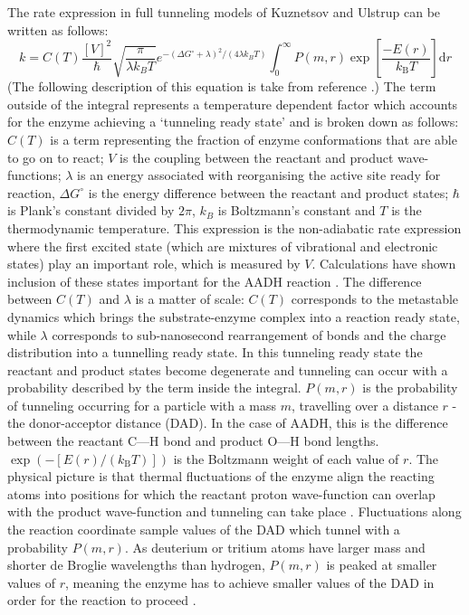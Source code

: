 The rate expression in full tunneling models of Kuznetsov and Ulstrup \cite{kuznetsovProtonHydrogenAtom1999a, knappTemperatureDependentIsotopeEffects2002, kohenRoleDynamicsEnzyme2015} can be written as follows: 
\begin{equation}\label{eqn:full_tunnel}
k = C(T)\frac{[V]^{2}}{\hbar} \sqrt{\frac{\pi}{\lambda k_{B}T}} e^{-(\Delta G^{\circ} + \lambda)^{2}/(4\lambda k_{B}T)} \int_{0}^{\infty} P(m,r) \exp \left[\frac{-E(r) }{k_{\mathrm{B}} T}\right] \mathrm{d}r
\end{equation}
(The following description of this equation is take from reference \cite{klinmanHydrogenTunnelingLinks2013}.) The term outside of the integral represents a temperature dependent factor which accounts for the enzyme achieving a `tunneling ready state' and is broken down as follows: $C(T)$ is a term representing the fraction of enzyme conformations that are able to go on to react; $V$ is the coupling between the reactant and product wave-functions;  $\lambda$ is an energy associated with reorganising the active site ready for reaction, $\Delta G^{\circ}$ is  the energy difference between the reactant and product states; $\hbar$ is Plank's constant divided by $2\pi$, $k_{B}$ is Boltzmann's constant and $T$ is the thermodynamic temperature. This expression is the non-adiabatic rate expression where the first excited state (which are mixtures of vibrational and electronic states) play an important role, which is measured by $V$. Calculations have shown inclusion of these states important for the AADH reaction \cite{johannissenProtonTunnelingAromatic2007}.   The difference between $C(T)$ and $\lambda$ is a matter of scale: $C(T)$ corresponds to the metastable dynamics which brings the substrate-enzyme complex into a reaction ready state, while $\lambda$ corresponds to sub-nanosecond rearrangement of bonds and the charge distribution into a tunnelling ready state. In this tunneling ready state the reactant and product states become degenerate and tunneling can occur with a probability described by the term inside the integral.  $P(m, r)$ is the probability of tunneling occurring for a particle with a mass $m$, travelling over a distance $r$ - the donor-acceptor distance (DAD). In the case of AADH, this is the difference between the reactant C---H bond and product O---H bond lengths.   $\exp{\left(-\left[E(r) /\left(k_{\mathrm{B}} T\right)\right]\right)}$ is the Boltzmann weight of each value of $r$. The physical picture is that thermal fluctuations of the enzyme align the reacting atoms into positions for which the reactant proton wave-function can overlap with the product wave-function and tunneling can take place \cite{klinmanHydrogenTunnelingLinks2013, kohenRoleDynamicsEnzyme2015}. Fluctuations along the reaction coordinate sample values of the DAD which tunnel with a probability $P(m,r)$. As deuterium or tritium atoms have larger mass and shorter de Broglie wavelengths than hydrogen,  $P(m,r)$ is peaked at smaller values of $r$, meaning the enzyme has to achieve smaller values of the DAD in order for the reaction to proceed \cite{klinmanHydrogenTunnelingLinks2013, kohenRoleDynamicsEnzyme2015}. 

